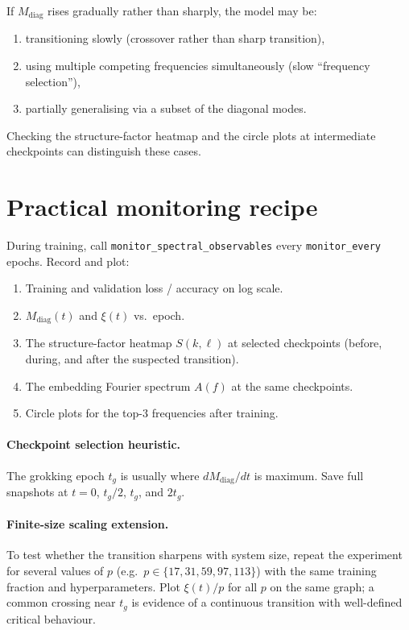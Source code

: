 \documentclass[11pt]{article}
\newcommand{\diag}{\mathrm{diag}}
\begin{document}
If $M_{\diag}$ rises gradually rather than sharply, the model may be:
\begin{enumerate}
    \item transitioning slowly (crossover rather than sharp transition),
    \item using multiple competing frequencies simultaneously
    (slow ``frequency selection''),
    \item partially generalising via a subset of the diagonal modes.
\end{enumerate}
Checking the structure-factor heatmap and the circle plots at intermediate
checkpoints can distinguish these cases.

\section{Practical monitoring recipe}
\label{sec:recipe}

During training, call \texttt{monitor\_spectral\_observables} every
\texttt{monitor\_every} epochs.
Record and plot:
\begin{enumerate}
    \item Training and validation loss / accuracy on log scale.
    \item $M_{\diag}(t)$ and $\xi(t)$ vs.\ epoch.
    \item The structure-factor heatmap $S(k,\ell)$ at selected checkpoints
    (before, during, and after the suspected transition).
    \item The embedding Fourier spectrum $A(f)$ at the same checkpoints.
    \item Circle plots for the top-3 frequencies after training.
\end{enumerate}

\paragraph{Checkpoint selection heuristic.}
The grokking epoch $t_g$ is usually where $dM_{\diag}/dt$ is maximum.
Save full snapshots at $t = 0$, $t_g/2$, $t_g$, and $2t_g$.

\paragraph{Finite-size scaling extension.}
To test whether the transition sharpens with system size, repeat the
experiment for several values of $p$ (e.g.\ $p\in\{17,31,59,97,113\}$)
with the same training fraction and hyperparameters.
Plot $\xi(t)/p$ for all $p$ on the same graph; a common crossing near $t_g$
is evidence of a continuous transition with well-defined critical behaviour.
\end{document}
